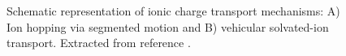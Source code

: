 \begin{figure}[h]
	\centering
	\hspace{2em}
	\caption[Ionic transport mechanisms in OMIECs]{Schematic representation of ionic charge transport mechanisms: A) Ion hopping via segmented motion and B) vehicular solvated-ion transport. Extracted from reference \cite{paulsenOrganicMixedIonic2020}.}
	\label{fig:itrans}
\end{figure}



 

